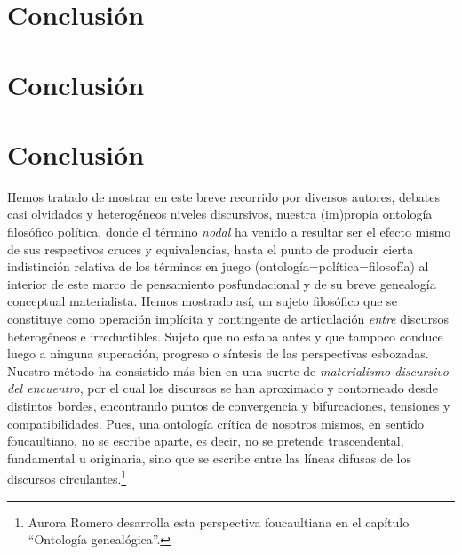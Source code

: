 \ifPDF
\chapter[\hspace{1.5pc}Conclusión]{Conclusión}
\setcounter{PrimPag}{\theCurrentPage}
\fi

\ifBNPDF
\chapter[\hspace{1.5pc}Conclusión]{Conclusión}
\fi

\ifHTMLEPUB
\chapter{Conclusión}
\fi

Hemos tratado de mostrar en este breve recorrido por diversos autores,
debates casi olvidados y heterogéneos niveles discursivos, nuestra
(im)propia ontología filosófico política, donde el término \emph{nodal}
ha venido a resultar ser el efecto mismo de sus respectivos cruces y
equivalencias, hasta el punto de producir cierta indistinción relativa
de los términos en juego (ontología=política=filosofía) al interior de
este marco de pensamiento posfundacional y de su breve genealogía
conceptual materialista. Hemos mostrado así, un sujeto filosófico que se
constituye como operación implícita y contingente de articulación
\emph{entre} discursos heterogéneos e irreductibles. Sujeto que no
estaba antes y que tampoco conduce luego a ninguna superación, progreso
o síntesis de las perspectivas esbozadas. Nuestro método ha consistido
más bien en una suerte de \emph{materialismo discursivo del encuentro},
por el cual los discursos se han aproximado y contorneado desde
distintos bordes, encontrando puntos de convergencia y bifurcaciones,
tensiones y compatibilidades. Pues, una ontología crítica de nosotros
mismos, en sentido foucaultiano, no se escribe aparte, es decir, no se
pretende trascendental, fundamental u originaria, sino que se escribe
entre las líneas difusas de los discursos circulantes.\footnote{Aurora
	Romero desarrolla esta perspectiva foucaultiana en el capítulo
	\enquote{Ontología genealógica}.}

